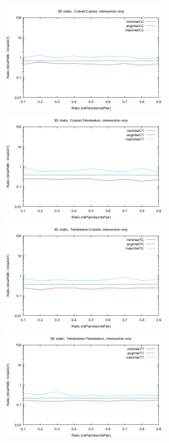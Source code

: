 \documentclass[12pt, a4paper]{article}
\begin{document}
\begin{center}
\begin{figure}[H]
\centering\includegraphics[width=7cm]{../Results/qualification3DCCinter.png}
\centering\includegraphics[width=7cm]{../Results/qualification3DCTinter.png}
\centering\includegraphics[width=7cm]{../Results/qualification3DTCinter.png}
\centering\includegraphics[width=7cm]{../Results/qualification3DTTinter.png}
\end{figure}
\end{center}
\end{document}
